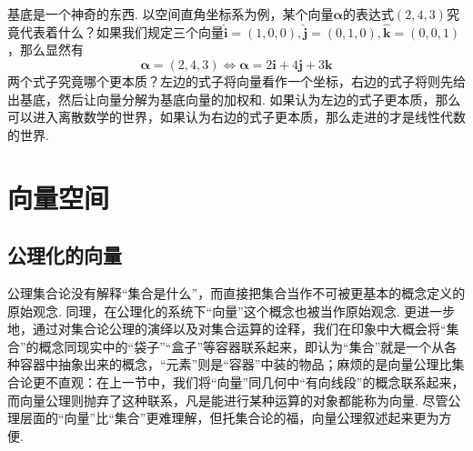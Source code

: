 \documentclass[main.tex]{subfiles}
\begin{document}
\vspace{1cm}

基底是一个神奇的东西. 以空间直角坐标系为例，某个向量\(\bm{\alpha}\)的表达式\((2,4,3)\)究竟代表着什么？如果我们规定三个向量\(\bm{\hat{i}} = (1,0,0), \bm{\hat{j}} = (0,1,0), \bm{\hat{k}} = (0,0,1)\)，那么显然有
\[\bm\alpha = (2,4,3) \Longleftrightarrow \bm\alpha = 2\bm i + 4\bm j + 3\bm k\]
两个式子究竟哪个更本质？左边的式子将向量看作一个坐标，右边的式子将则先给出基底，然后让向量分解为基底向量的加权和. 如果认为左边的式子更本质，那么可以进入离散数学的世界，如果认为右边的式子更本质，那么走进的才是线性代数的世界. 

\section{向量空间}

\subsection{公理化的向量}

公理集合论没有解释“集合是什么”，而直接把集合当作不可被更基本的概念定义的原始观念. 同理，在公理化的系统下“向量”这个概念也被当作原始观念. 更进一步地，通过对集合论公理的演绎以及对集合运算的诠释，我们在印象中大概会将“集合”的概念同现实中的“袋子”“盒子”等容器联系起来，即认为“集合”就是一个从各种容器中抽象出来的概念，“元素”则是“容器”中装的物品；麻烦的是向量公理比集合论更不直观：在上一节中，我们将“向量”同几何中“有向线段”的概念联系起来，而向量公理则抛弃了这种联系，凡是能进行某种运算的对象都能称为向量. 尽管公理层面的“向量”比“集合”更难理解，但托集合论的福，向量公理叙述起来更为方便. 
\end{document}
